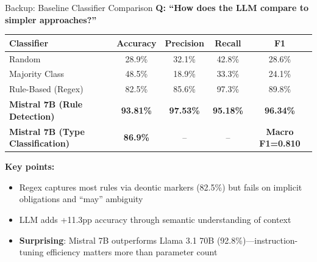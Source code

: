 \documentclass[aspectratio=169, 10pt]{beamer}
\begin{document}
\begin{frame}{Backup: Baseline Classifier Comparison}
    \textbf{Q: ``How does the LLM compare to simpler approaches?''}

    \vspace{0.3cm}
    \begin{table}[]
        \centering
        \begin{tabular}{lcccc}
            \toprule
            \textbf{Classifier} & \textbf{Accuracy} & \textbf{Precision} & \textbf{Recall} & \textbf{F1} \\
            \midrule
            Random & 28.9\% & 32.1\% & 42.8\% & 28.6\% \\
            Majority Class & 48.5\% & 18.9\% & 33.3\% & 24.1\% \\
            Rule-Based (Regex) & 82.5\% & 85.6\% & 97.3\% & 89.8\% \\
            \midrule
            \textbf{Mistral 7B (Rule Detection)} & \textbf{93.81\%} & \textbf{97.53\%} & \textbf{95.18\%} & \textbf{96.34\%} \\
            \textbf{Mistral 7B (Type Classification)} & \textbf{86.9\%} & -- & -- & \textbf{Macro F1=0.810} \\
            \bottomrule
        \end{tabular}
    \end{table}

    \vspace{0.3cm}
    \textbf{Key points:}
    \begin{itemize}
        \item Regex captures most rules via deontic markers (82.5\%) but fails on implicit obligations and ``may'' ambiguity
        \item LLM adds +11.3pp accuracy through semantic understanding of context
        \item \textbf{Surprising}: Mistral 7B outperforms Llama 3.1 70B (92.8\%)---instruction-tuning efficiency matters more than parameter count
    \end{itemize}
\end{frame}
\end{document}
